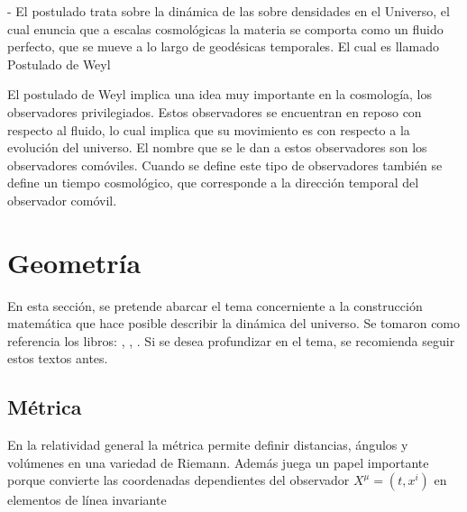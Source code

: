 - El postulado trata sobre la dinámica de las sobre densidades en el Universo, el cual enuncia que a escalas cosmológicas la materia se comporta como un fluido perfecto, que se mueve a lo largo de geodésicas temporales. El cual es llamado Postulado de Weyl \cite{janssen2013} %


El postulado de Weyl implica una idea muy importante en la cosmología, los observadores privilegiados. Estos observadores  se encuentran en reposo con respecto al fluido, lo cual implica que su movimiento es con respecto a la evolución del universo. El nombre que se le dan a estos observadores son los observadores comóviles. Cuando se define este tipo de observadores también se define un tiempo cosmológico, que corresponde a la dirección temporal del observador comóvil. 



\section{Geometría}
\label{sec:Geometría}
En esta sección, se pretende abarcar el tema concerniente a la construcción matemática que hace posible describir la dinámica del universo. Se tomaron como referencia los libros: \cite{janssen2013}, \cite{longair2008}, \cite{baumann}. Si se desea profundizar en el tema, se recomienda seguir estos textos antes.
	\subsection{Métrica}
	\label{subsec:Metrica}
	
En la relatividad general la métrica permite definir distancias, ángulos y volúmenes en una variedad de Riemann. Además juega un papel importante porque convierte las coordenadas dependientes del observador $X^{\mu}=(t,x^{i})$ en elementos de línea invariante


